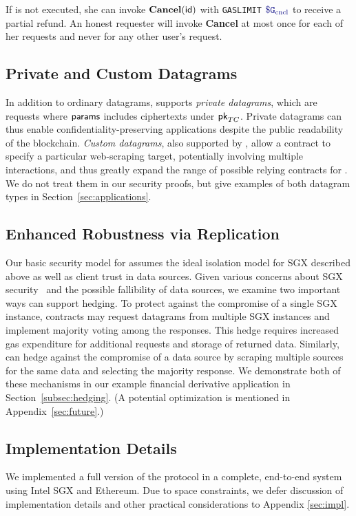 If \dgcallback is not executed, she can invoke ${\bf Cancel}({\sf id})$ with {\tt GASLIMIT} $\constgasinvokecancel$ to receive a partial refund.
An honest requester will invoke {\bf Cancel} at most once for each of her requests and never for any other user's request.

\subsection{Private and Custom Datagrams}
\label{subsec:private_datagrams}
In addition to ordinary datagrams, \tc supports \emph{private datagrams}, which are requests where ${\sf params}$ includes ciphertexts under ${\sf pk}_{TC}$. Private datagrams can thus enable confidentiality-preserving applications despite the public readability of the blockchain.  \emph{Custom datagrams}, also supported by \tc, allow a contract to specify a particular web-scraping target, potentially involving multiple interactions, and thus greatly expand the range of possible relying contracts for \tc. We do not treat them in our security proofs, but give examples of both datagram types in Section~\ref{sec:applications}.

\subsection{Enhanced Robustness via Replication}
\label{subsec:enhanced_robustness}
Our basic security model for \tc assumes the ideal isolation model for SGX described above as well as client trust in data sources. Given various concerns about SGX security~\cite{sgxexplained,7163052} and the possible fallibility of data sources, we examine two important ways \tc can support hedging.
To protect against the compromise of a single SGX instance, contracts may request datagrams from multiple SGX instances and implement majority voting among the responses.
This hedge requires increased gas expenditure for additional requests and storage of returned data.
Similarly, \tc can hedge against the compromise of a data source by scraping multiple sources for the same data and selecting the majority response. We demonstrate both of these mechanisms in our example financial derivative application in Section~\ref{subsec:hedging}. (A potential optimization is mentioned in Appendix~\ref{sec:future}.)


\subsection{Implementation Details}
We implemented a full version of the \tc protocol in a complete, end-to-end system using Intel SGX and Ethereum. Due to space constraints, 
we defer discussion of implementation details and other practical considerations to 
Appendix \ref{sec:impl}.

